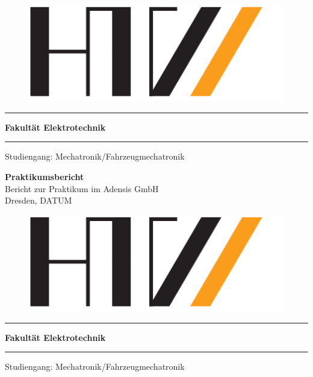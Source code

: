 \documentclass[a4paper,10pt, titlepage]{scrreprt}
\begin{document}
\begin{titlepage}
\thispagestyle{empty} 		%
\linespread{1.0}

\begin{figure}
\includegraphics[scale=0.3]{images/HTW-Logo}
\end{figure}

\hrule
\vspace{0.2 cm}
\textbf{Fakultät Elektrotechnik}
\vspace{0.1 cm}
\hrule
\vspace{0.2 cm}
Studiengang: Mechatronik/Fahrzeugmechatronik 

\begin{flushleft}
\vspace{8 cm}
\huge\textbf{Praktikumsbericht}\\ [0.5 cm]
\Large{Bericht zur Praktikum im Adensis GmbH}\\ [1.5 cm]
\Large{Dresden, DATUM}
\end{flushleft}
\pagebreak 


\thispagestyle{empty} 		%
\begin{figure}
\includegraphics[scale=0.3]{images/HTW-Logo}
\end{figure}

\hrule
\vspace{0.2 cm}
\textbf{Fakultät Elektrotechnik}
\vspace{0.1 cm}
\hrule
\vspace{0.2 cm}
Studiengang: Mechatronik/Fahrzeugmechatronik 


\end{titlepage}
\end{document}
